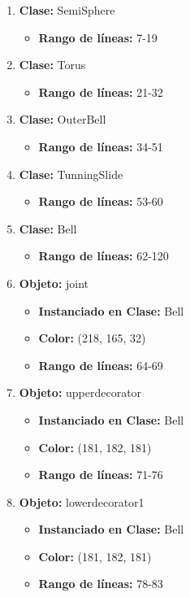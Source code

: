 \documentclass[10pt, a4paper]{article}
\begin{document}
\begin{enumerate}
	\item \textbf{Clase:} SemiSphere
	\begin{itemize}
		\item \textbf{Rango de líneas:} 7-19
	\end{itemize}
	\item \textbf{Clase:} Torus
	\begin{itemize}
		\item \textbf{Rango de líneas:} 21-32
	\end{itemize}
	\item \textbf{Clase:} OuterBell
	\begin{itemize}
		\item \textbf{Rango de líneas:} 34-51
	\end{itemize}
	\item \textbf{Clase:} TunningSlide
	\begin{itemize}
		\item \textbf{Rango de líneas:} 53-60
	\end{itemize}
	\item \textbf{Clase:} Bell
	\begin{itemize}
		\item \textbf{Rango de líneas:} 62-120
	\end{itemize}
	\item \textbf{Objeto:} joint
	\begin{itemize}
		\item \textbf{Instanciado en Clase:} Bell
		\item \textbf{Color:} (218, 165, 32)
		\item \textbf{Rango de líneas:} 64-69
	\end{itemize}
	\item \textbf{Objeto:} upperdecorator
	\begin{itemize}
		\item \textbf{Instanciado en Clase:} Bell
		\item \textbf{Color:} (181, 182, 181)
		\item \textbf{Rango de líneas:} 71-76
	\end{itemize}
	\item \textbf{Objeto:} lowerdecorator1 
	\begin{itemize}
		\item \textbf{Instanciado en Clase:} Bell
		\item \textbf{Color:} (181, 182, 181)
		\item \textbf{Rango de líneas:} 78-83

\end{itemize}
\end{enumerate}
\end{document}
